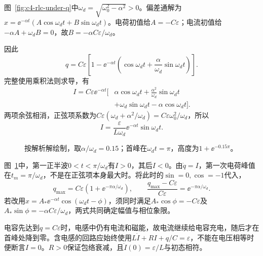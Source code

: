 \begin{solution}
图~\ref{fig:c4-rlc-under-q}中$\omega_d=\sqrt{\omega_0^2-\alpha^2}>0$。偏差通解为$x=\ee^{-\alpha t}(A\cos\omega_dt+B\sin\omega_dt)$。电荷初值给$A=-C\varepsilon$；电流初值给$-\alpha A+\omega_dB=0$，故$B=-\alpha C\varepsilon/\omega_d$。

因此
\[
 \boxed{q=C\varepsilon\left[1-\ee^{-\alpha t}
 \left(\cos\omega_dt+\frac\alpha{\omega_d}\sin\omega_dt\right)\right]}.
\]
完整使用乘积法则求导，有
\[
 \begin{aligned}
 I=C\varepsilon\ee^{-\alpha t}\biggl[
 &\alpha\cos\omega_dt+\frac{\alpha^2}{\omega_d}\sin\omega_dt\\
 &+\omega_d\sin\omega_dt-\alpha\cos\omega_dt\biggr].
 \end{aligned}
\]
两项余弦相消，正弦项系数为$C\varepsilon(\omega_d+\alpha^2/\omega_d)=C\varepsilon\omega_0^2/\omega_d$，所以
\[
 \boxed{I=\frac\varepsilon{L\omega_d}\ee^{-\alpha t}\sin\omega_dt}.
\]
\begin{figure}[H]\centering
{}
\caption{按解析解绘制，取$\alpha/\omega_d=0.15$；首峰在$\omega_dt=\pi$，高度为$1+\ee^{-0.15\pi}$。}\label{fig:c4-rlc-under-s}
\end{figure}
图~\ref{fig:c4-rlc-under-s}中，第一正半波$0<t<\pi/\omega_d$有$I>0$，其后$I<0$。由$\dot q=I$，第一次电荷峰值在$t_m=\pi/\omega_d$，不是在正弦项本身最大时。将此时的$\sin=0,\cos=-1$代入，
\[
 q_{\max}=C\varepsilon(1+\ee^{-\pi\alpha/\omega_d}),\qquad
 \boxed{\frac{q_{\max}-C\varepsilon}{C\varepsilon}=\ee^{-\pi\alpha/\omega_d}}.
\]
若改用$x=A_*\ee^{-\alpha t}\cos(\omega_dt-\phi)$，须同时满足$A_*\cos\phi=-C\varepsilon$及$A_*\sin\phi=-\alpha C\varepsilon/\omega_d$，两式共同确定幅值与相位象限。

电容先达到$q=C\varepsilon$时，电感中仍有电流和磁能，故电流继续给电容充电，随后才在首峰处降到零。含电感的回路应始终使用$L\dot I+RI+q/C=\varepsilon$，不能在电压相等时便断言$I=0$。$R>0$保证包络衰减，且$\dot I(0)=\varepsilon/L$与初态相符。
\end{solution}


